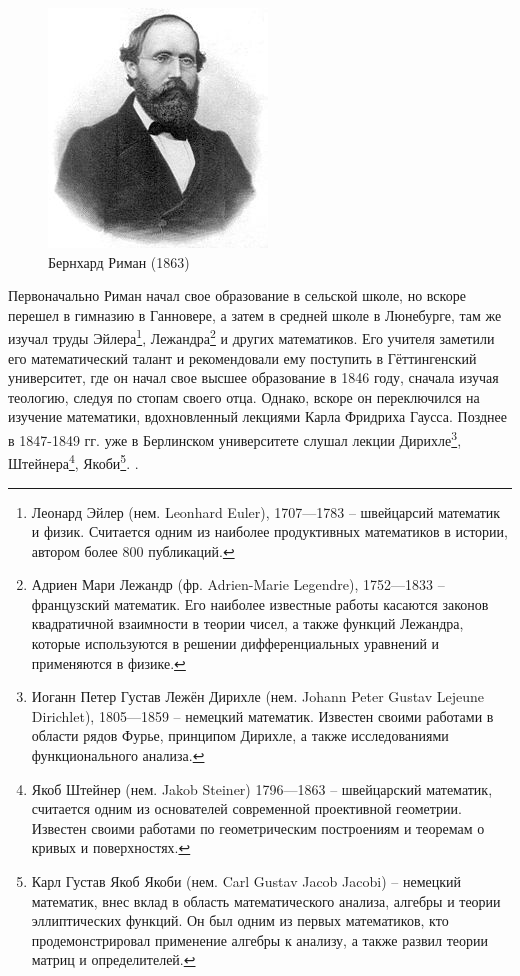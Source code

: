 \documentclass[a4paper,12pt]{article}
\theoremstyle{remark}
\begin{document}
\begin{figure}[h]
  \centering
  \includegraphics{Georg_Friedrich_Bernhard_Riemann.jpeg}
  \caption{Бернхард Риман (1863)}
\end{figure}

Первоначально Риман начал свое образование в сельской школе,
но вскоре перешел в гимназию в Ганновере, а затем в средней
школе в Люнебурге, там же изучал труды Эйлера\footnote{
  Леонард Эйлер (нем. Leonhard Euler), 1707—1783 --
  швейцарсий математик и физик. Считается одним из наиболее продуктивных математиков
  в истории, автором более 800 публикаций.
}, Лежандра\footnote{
  Адриен Мари Лежандр (фр. Adrien-Marie Legendre), 1752—1833 --
  французский математик. Его наиболее известные работы касаются законов квадратичной взаимности
  в теории чисел, а также функций Лежандра, которые используются
  в решении дифференциальных уравнений и применяются в физике.
} и других математиков.
Его учителя заметили его математический талант
и рекомендовали ему поступить в Гёттингенский университет,
где он начал свое высшее образование в 1846 году, сначала
изучая теологию, следуя по стопам своего отца.
Однако, вскоре он переключился на изучение математики,
вдохновленный лекциями Карла Фридриха Гаусса.
Позднее в 1847-1849 гг. уже в Берлинском университете слушал
лекции Дирихле\footnote{
  Иоганн Петер Густав Лежён Дирихле (нем. Johann Peter Gustav Lejeune Dirichlet), 1805—1859 --
  немецкий математик. Известен своими работами в области рядов Фурье, принципом Дирихле,
  а также исследованиями функционального анализа.
}, Штейнера\footnote{
  Якоб Штейнер (нем. Jakob Steiner) 1796—1863 --
  швейцарский математик, считается одним из основателей
  современной проективной геометрии. Известен своими работами по
  геометрическим построениям и теоремам о кривых и поверхностях.
}, Якоби\footnote{
  Карл Густав Якоб Якоби (нем. Carl Gustav Jacob Jacobi) --
  немецкий математик, внес вклад в область математического анализа, алгебры и теории эллиптических
  функций. Он был одним из первых математиков, кто продемонстрировал
  применение алгебры к анализу, а также развил теории матриц и определителей.
}. \cite{MathEncyclopedia}.
\end{document}
